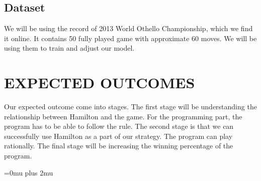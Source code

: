 \documentclass[aps,pra,reprint,amsmath,amssymb,floatfix]{revtex4-2}
\begin{document}
\subsection{Dataset}
We will be using the record of 2013 World Othello Championship, which we find it online.\cite{othello_dataset}  It contains 50 fully played game with approximate 60 moves. We will be using them to train and adjust our model.
\section{EXPECTED OUTCOMES}
Our expected outcome come into stages. The first stage will be understanding the relationship between Hamilton and the game. For the programming part, the program has to be able to follow the rule. The second stage is that we can successfully use Hamilton as a part of our strategy. The program can play rationally. The final stage will be increasing the winning percentage of the program.

\nocite{*}
\Urlmuskip=0mu plus 2mu\relax


\end{document}
